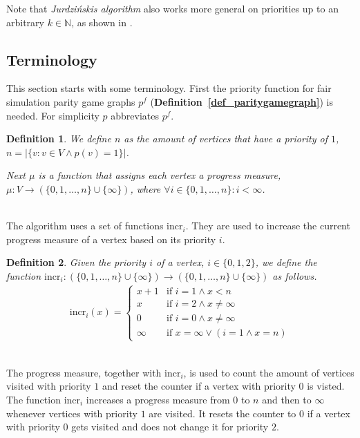 \documentclass[12pt,oneside,bibliography=totoc,abstracton]{scrartcl}
\newcommand{\defref}[1]{\textbf{Definition~\ref{#1}}}
\newcommand{\libref}[1]{\textbf{\cite{#1}}}
\newtheorem{mydef}{Definition}
\begin{document}
Note that \textit{Jurdzi\'nskis algorithm} also works more general on priorities up to an arbitrary $k \in \mathbb{N}$, as shown
in \libref{simulation_general}.

\subsection{Terminology}\label{section_computingterminology}
This section starts with some terminology. First the priority function for fair simulation parity game graphs
$p^f$ (\defref{def_paritygamegraph}) is needed. For simplicity $p$ abbreviates $p^f$.
\begin{mydef}
	We define $n$ as the amount of vertices that have a priority of $1$,
	$n = |\{v : v \in V \land p(v) = 1\}|$.
	
	Next $\mu$ is a function that assigns each vertex a progress measure,
	$\mu: V \to \left(\{0, 1, \ldots, n\} \cup \{\infty\}\right)$, where $\forall i \in \{0, 1, \ldots, n\}: i < \infty$.
\end{mydef}\quad\\
The algorithm uses a set of functions $\text{incr}_i$. They are used to increase the current progress measure
of a vertex based on its priority $i$.
\begin{mydef}
	Given the priority $i$ of a vertex, $i \in \{0, 1, 2\}$, we define the function
	$\text{incr}_i : (\{0, 1, \ldots, n\} \cup \{\infty\}) \to (\{0, 1, \ldots, n\} \cup \{\infty\})$ as follows.
	\begin{align*}
		\text{incr}_i(x) = \begin{cases} x + 1 & \text{if } i = 1 \land x < n\\
					x & \text{if } i = 2 \land x \neq \infty\\
					0 & \text{if } i = 0 \land x \neq \infty\\
					\infty & \text{if } x = \infty \lor (i = 1 \land x = n)
				\end{cases}
	\end{align*}
\end{mydef}\quad\\
The progress measure, together with $\text{incr}_i$, is used to count the amount of vertices visited
with priority $1$ and reset the counter if a vertex with priority $0$ is visted. The function $\text{incr}_i$
increases a progress measure from $0$ to $n$ and then to $\infty$ whenever vertices with priority
$1$ are visited. It resets the counter to $0$ if a vertex with priority $0$ gets visited
and does not change it for priority $2$.
\end{document}
